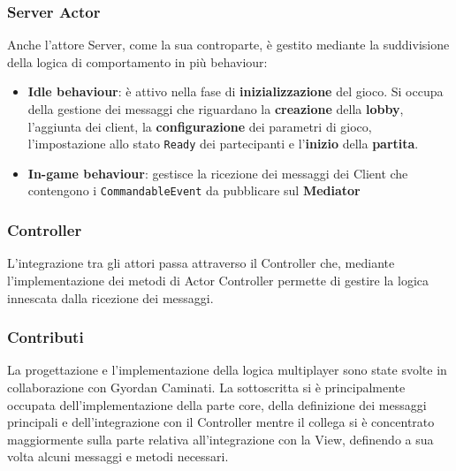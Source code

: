 \subsubsection{Server Actor}
Anche l'attore Server, come la sua controparte, è gestito mediante la suddivisione della logica di comportamento in più behaviour:
    \begin{itemize}
        \item \textbf{Idle behaviour}: è attivo nella fase di \textbf{inizializzazione} del gioco. Si occupa della gestione dei messaggi che riguardano la \textbf{creazione} della \textbf{lobby}, l'aggiunta dei client, la \textbf{configurazione} dei parametri di gioco, l'impostazione allo stato \texttt{Ready} dei partecipanti e l'\textbf{inizio} della \textbf{partita}.  
        \item \textbf{In-game behaviour}: gestisce la ricezione dei messaggi dei Client che contengono i \texttt{CommandableEvent} da pubblicare sul \textbf{Mediator}
    \end{itemize}
    
\subsubsection{Controller}
L'integrazione tra gli attori passa attraverso il Controller che, mediante l'implementazione dei metodi di Actor Controller permette di gestire la logica innescata dalla ricezione dei messaggi.
\subsubsection{Contributi}
La progettazione e l'implementazione della logica multiplayer sono state svolte in collaborazione con Gyordan Caminati. La sottoscritta si è principalmente occupata dell'implementazione della parte core, della definizione dei messaggi principali e dell'integrazione con il Controller mentre il collega si è concentrato maggiormente sulla parte relativa all'integrazione con la View, definendo a sua volta alcuni messaggi e metodi necessari.

